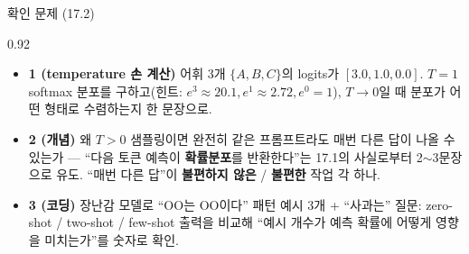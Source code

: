 \begin{frame}{확인 문제 (17.2)}
\begin{center}\begin{varwidth}{0.92\textwidth}
  \begin{itemize}
    \item \textbf{1 (temperature 손 계산)} 어휘 3개
      $\{A,B,C\}$의 logits가 $[3.0, 1.0, 0.0]$. $T=1$
      softmax 분포를 구하고(힌트: $e^3 \approx 20.1, e^1
      \approx 2.72, e^0 = 1$), $T \to 0$일 때 분포가 어떤
      형태로 수렴하는지 한 문장으로.
    \item \textbf{2 (개념)} 왜 $T > 0$ 샘플링이면 완전히
      같은 프롬프트라도 매번 다른 답이 나올 수 있는가 —
      ``다음 토큰 예측이 \textbf{확률분포}를 반환한다''는
      17.1의 사실로부터 2$\sim$3문장으로 유도. ``매번 다른
      답''이 \textbf{불편하지 않은} / \textbf{불편한} 작업
      각 하나.
    \item \textbf{3 (코딩)} 장난감 모델로 ``OO는 OO이다''
      패턴 예시 3개 + ``사과는'' 질문: zero-shot / two-shot /
      few-shot 출력을 비교해 ``예시 개수가 예측 확률에
      어떻게 영향을 미치는가''를 숫자로 확인.
  \end{itemize}
\end{varwidth}\end{center}
\end{frame}
